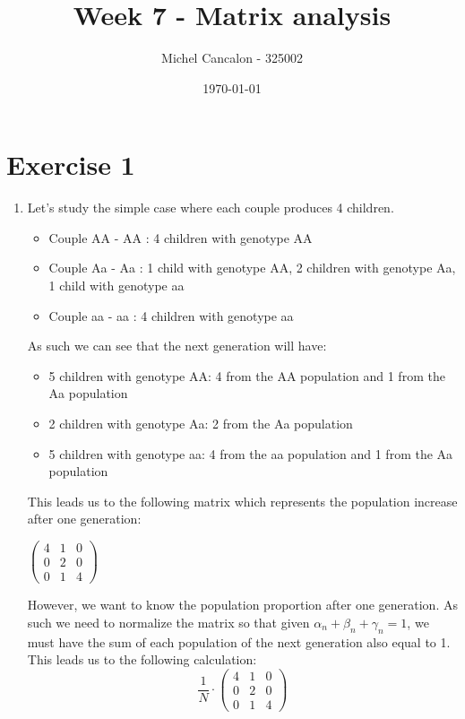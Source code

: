 \documentclass[11pt, legalpaper]{article}
\title{Week 7 - Matrix analysis}
\author{Michel Cancalon - 325002}
\date{\today}
\begin{document}
\maketitle

\section{Exercise 1}
\begin{enumerate}
    \item Let's study the simple case where each couple produces 4 children.
    \begin{itemize}
        \item Couple AA - AA : 4 children with genotype AA
        \item Couple Aa - Aa : 1 child with genotype AA, 2 children with genotype Aa, 1 child with genotype aa
        \item Couple aa - aa : 4 children with genotype aa
    \end{itemize}
    As such we can see that the next generation will have:
    \begin{itemize}
        \item 5 children with genotype AA: 4 from the AA population and 1 from the Aa population
        \item 2 children with genotype Aa: 2 from the Aa population
        \item 5 children with genotype aa: 4 from the aa population and 1 from the Aa population
    \end{itemize}
    This leads us to the following matrix which represents the population increase after one generation:
    \begin{center}
        $\begin{pmatrix}
            4 & 1 & 0 \\
            0 & 2 & 0 \\
            0 & 1 & 4
        \end{pmatrix}$
    \end{center}
    However, we want to know the population proportion after one generation. As such we need to normalize the matrix so that given $\alpha_n + \beta_n + \gamma_n = 1$, we must have the sum of each population of the next generation also equal to 1. This leads us to the following calculation:
    $$\frac{1}{N}\cdot \begin{pmatrix}
        4 & 1 & 0 \\
        0 & 2 & 0 \\
        0 & 1 & 4

\end{pmatrix}$$
\end{enumerate}
\end{document}
